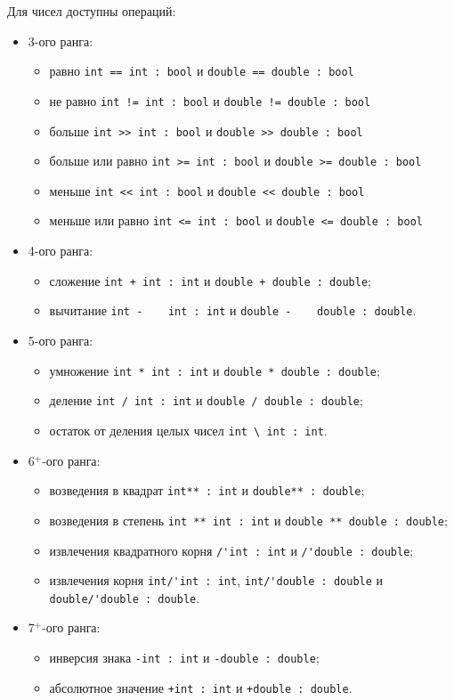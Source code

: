 \documentclass[a4paper, 14pt]{extarticle}
\newenvironment{icItems}
	{ \begin{itemize} [noitemsep,nolistsep] }
	{ \end{itemize} }
\begin{document}
Для чисел доступны операций:
\begin{icItems}
	\item
		3-ого ранга:
		\begin{icItems}
			\item
				равно \lstinline`int == int : bool` и \lstinline`double == double : bool`
			\item
				не равно \lstinline`int != int : bool` и \lstinline`double != double : bool`
			\item
				больше \lstinline`int >> int : bool` и \lstinline`double >> double : bool`
			\item
				больше или равно \lstinline`int >= int : bool` и \lstinline`double >= double : bool`
			\item
				меньше \lstinline`int << int : bool` и \lstinline`double << double : bool`
			\item
				меньше или равно \lstinline`int <= int : bool` и \lstinline`double <= double : bool`
		\end{icItems}
	\item
		4-ого ранга:
		\begin{icItems}
			\item
				сложение \lstinline`int + int : int` и \lstinline`double + double : double`;
			\item
				вычитание \lstinline`int -    int : int` и \lstinline`double -    double : double`.
		\end{icItems}
	\item
		5-ого ранга:
		\begin{icItems}
			\item
				умножение \lstinline`int * int : int` и \lstinline`double * double : double`;
			\item
				деление \lstinline`int / int : int` и \lstinline`double / double : double`;
			\item
				остаток от деления целых чисел \lstinline`int \ int : int`.
		\end{icItems}
	\item
		6$^+$-ого ранга:
		\begin{icItems}
			\item
				возведения в квадрат \lstinline`int** : int` и \lstinline`double** : double`;
			\item
				возведения в степень \lstinline`int ** int : int` и \lstinline`double ** double : double`;
			\item
				извлечения квадратного корня \lstinline`/'int : int` и \lstinline`/'double : double`;
			\item
				извлечения корня \lstinline`int/'int : int`, \lstinline|int/'double : double| и \lstinline`double/'double : double`.
		\end{icItems}
	\item
		7$^+$-ого ранга:
		\begin{icItems}
			\item
				инверсия знака \lstinline`-int : int` и \lstinline`-double : double`;
			\item
				абсолютное значение \lstinline`+int : int` и \lstinline`+double : double`.
		\end{icItems}
\end{icItems}
\end{document}
